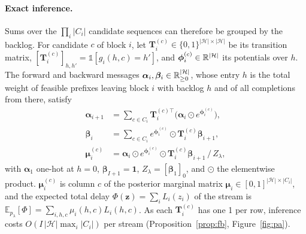 \paragraph{Exact inference.} Sums over the $\prod_i|C_i|$ candidate sequences can therefore be grouped by the backlog.
For candidate $c$ of block $i$, let $\bm{T}_i^{(c)}\in\{0,1\}^{|\mathcal{H}|\times|\mathcal{H}|}$ be its transition matrix,
$[\bm{T}_i^{(c)}]_{h,h'}=\mathds{1}[g_i(h,c)=h']$, and $\bm{\phi}_i^{(c)}\in\mathbb{R}^{|\mathcal{H}|}$ its potentials over $h$.
The forward and backward messages $\bm{\alpha}_i,\bm{\beta}_i\in\mathbb{R}_{\ge0}^{|\mathcal{H}|}$, whose entry $h$ is the total
weight of feasible prefixes leaving block $i$ with backlog $h$ and of all completions from there, satisfy
\begin{equation}
\begin{aligned}
\bm{\alpha}_{i+1}&=\textstyle\sum_{c\in C_i}\bm{T}_i^{(c)\top}\big(\bm{\alpha}_i\odot e^{\bm{\phi}_i^{(c)}}\big),\\
\bm{\beta}_i&=\textstyle\sum_{c\in C_i}e^{\bm{\phi}_i^{(c)}}\odot\bm{T}_i^{(c)}\bm{\beta}_{i+1},\\
\bm{\mu}_i^{(c)}&=\bm{\alpha}_i\odot e^{\bm{\phi}_i^{(c)}}\odot\bm{T}_i^{(c)}\bm{\beta}_{i+1}\,/\,Z_\lambda,
\end{aligned}
\label{eq:fb}
\end{equation}
with $\bm{\alpha}_1$ one-hot at $h=0$, $\bm{\beta}_{I+1}=\bm{1}$, $Z_\lambda=[\bm{\beta}_1]_0$, and $\odot$ the elementwise
product. $\bm{\mu}_i^{(c)}$ is column $c$ of the posterior marginal matrix $\bm{\mu}_i\in[0,1]^{|\mathcal{H}|\times|C_i|}$,
and the expected total delay $\Phi(\bm{z})=\sum_iL_i(z_i)$ of the stream is $\mathbb{E}_{p_\lambda}[\Phi]=\sum_{i,h,c}
\mu_i(h,c)L_i(h,c)$. As each $\bm{T}_i^{(c)}$ has one 1 per row, inference costs $O(I\,|\mathcal{H}|\max_i|C_i|)$ per
stream (Proposition~\ref{prop:fb}, Figure~\ref{fig:pa}).

